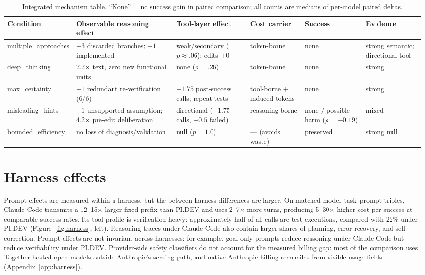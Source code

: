 \documentclass[11pt]{article}
\newcommand{\pidev}{PI.DEV}
\newcommand{\cc}{Claude Code}
\newcommand{\xd}{$\times$}
\begin{document}
\begin{table}[ht]\centering\scriptsize
\begin{tabular}{p{2.4cm}p{3.2cm}p{2.8cm}p{2.0cm}p{1.6cm}p{2.2cm}}
\toprule
Condition & Observable reasoning effect & Tool-layer effect & Cost carrier & Success & Evidence \\
\midrule
multiple\_approaches & $+3$ discarded branches; $+1$ implemented & weak/secondary ($p\approx.06$); edits $+0$ & token-borne & none & strong semantic; directional tool \\
deep\_thinking & 2.2\xd{} text, zero new functional units & none ($p=.26$) & token-borne & none & strong \\
max\_certainty & $+1$ redundant re-verification (6/6) & $+1.75$ post-success calls; repeat tests & tool-borne + induced tokens & none & strong \\
misleading\_hints & $+1$ unsupported assumption; 4.2\xd{} pre-edit deliberation & directional ($+1.75$ calls, $+0.5$ failed) & reasoning-borne & none / possible harm ($\rho=-0.19$) & mixed \\
bounded\_efficiency & no loss of diagnosis/validation & null ($p=1.0$) & --- (avoids waste) & preserved & strong null \\
\bottomrule
\end{tabular}
\caption{Integrated mechanism table. ``None'' = no success gain in paired
comparison; all counts are medians of per-model paired deltas.}
\end{table}

\section{Harness effects}
\label{sec:harness}
Prompt effects are measured within a harness, but the between-harness
differences are larger. On matched model--task--prompt triples, \cc{}
transmits a 12--15\xd{} larger fixed prefix than \pidev{} and uses 2--7\xd{}
more turns, producing 5--30\xd{} higher cost per success at comparable
success rates. Its tool profile is verification-heavy: approximately half
of all calls are test executions, compared with 22\% under \pidev{}
(Figure~\ref{fig:harness}, left).
Reasoning traces under \cc{} also contain larger shares of planning, error
recovery, and self-correction. Prompt effects are not invariant across
harnesses: for example, goal-only prompts reduce reasoning under \cc{} but
reduce verifiability under \pidev{}. Provider-side safety classifiers do
not account for the measured billing gap: most of the comparison uses
Together-hosted open models outside Anthropic's serving path, and native
Anthropic billing reconciles from visible usage fields
(Appendix~\ref{app:harness}).
\end{document}
